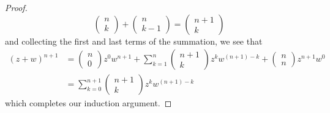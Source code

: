\documentclass[a4paper]{article}
\begin{document}
\begin{proof}
        \[  \begin{pmatrix} n \\ k  \end{pmatrix}  + \begin{pmatrix} n \\ k - 1  \end{pmatrix}  = \begin{pmatrix} n + 1 \\ k  \end{pmatrix}     \]
        and collecting the first and last terms of the summation, we see that 
        \begin{align*}
            (z+w)^{n+1} &= \begin{pmatrix} n \\ 0  \end{pmatrix} z^{0} w^{n+1} + \sum_{ k=1  }^{ n } \begin{pmatrix} n + 1 \\ k  \end{pmatrix}  z^{k } w^{(n+1)- k} + \begin{pmatrix} n \\ n  \end{pmatrix} z^{n+1} w^{0}  \\
                        &= \sum_{ k=0  }^{ n + 1   } \begin{pmatrix} n + 1 \\ k  \end{pmatrix} z^{k } w^{(n+1) - k} 
        \end{align*}
        which completes our induction argument. 
        \end{proof}
\end{document}
